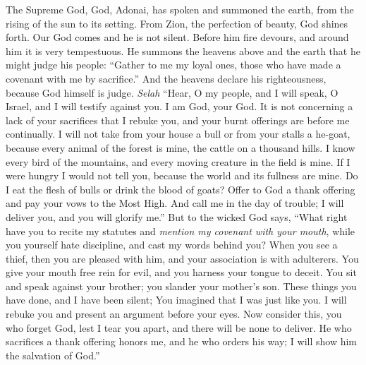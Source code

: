 \begin{biblechapter} %
 The Supreme God, God, Adonai, has spoken 
and summoned the earth, 
from the rising of the sun 
to its setting.
\verse From Zion, the perfection of beauty, 
God shines forth.
\verse Our God comes and he is not silent. 
Before him fire devours, 
and around him it is very tempestuous.
\verse He summons the heavens above 
and the earth that he might judge his people:
\verse “Gather to me my loyal ones, 
those who have made a covenant with me by sacrifice.”
\verse And the heavens declare his righteousness, 
because God himself is judge. \textit{Selah}
\verse “Hear, O my people, and I will speak, 
O Israel, and I will testify against you. 
I am God, your God.
\verse It is not concerning a lack of your sacrifices that I rebuke you, 
and your burnt offerings are before me continually.
\verse I will not take from your house a bull 
or from your stalls a he-goat,
\verse because every animal of the forest is mine, 
the cattle on a thousand hills.
\verse I know every bird of the mountains, 
and every moving creature in the field is mine.
\verse If I were hungry I would not tell you, 
because the world and its fullness are mine.
\verse Do I eat the flesh of bulls 
or drink the blood of goats?
\verse Offer to God a thank offering 
and pay your vows to the Most High.
\verse And call me in the day of trouble; 
I will deliver you, and you will glorify me.”
\verse But to the wicked God says, 
“What right have you to recite my statutes 
and \textit{mention my covenant with your mouth},
\verse while you yourself hate discipline, 
and cast my words behind you?
\verse When you see a thief, then you are pleased with him, 
and your association is with adulterers.
\verse You give your mouth free rein for evil, 
and you harness your tongue to deceit.
\verse You sit and speak against your brother; 
you slander your mother’s son.
\verse These things you have done, and I have been silent; 
You imagined that I was just like you. 
I will rebuke you and present an argument before your eyes.
\verse Now consider this, you who forget God, 
lest I tear you apart, and there will be none to deliver.
\verse He who sacrifices a thank offering honors me, 
and he who orders his way; 
I will show him the salvation of God.”
\end{biblechapter}


